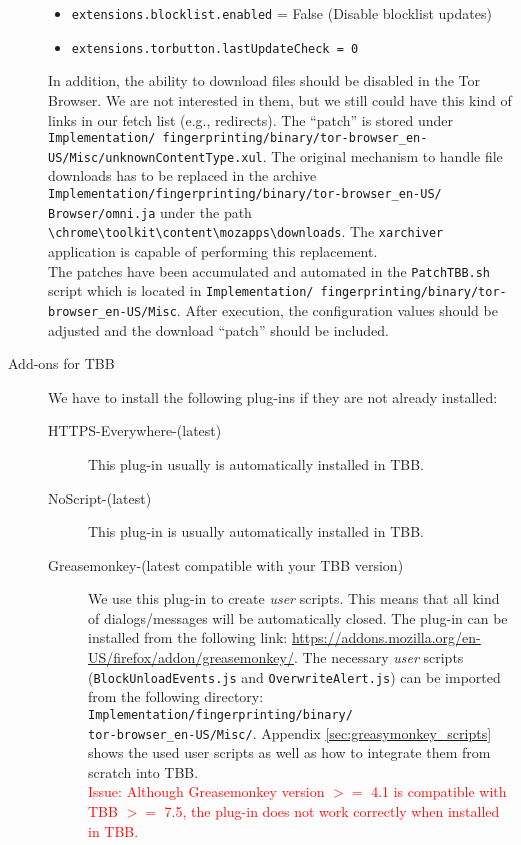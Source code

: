 \begin{description}
\begin{itemize}
\item \texttt{extensions.blocklist.enabled} = False (Disable blocklist updates)
\item \texttt{extensions.torbutton.lastUpdateCheck = 0}
\end{itemize}
In addition, the ability to download files should be disabled in the Tor Browser. We are not interested in them, but we still could have this kind of links in our fetch list (e.g., redirects). The ``patch'' is stored under \texttt{Implementation/ fingerprinting/binary/tor-browser\_en-US/Misc/unknownContentType.xul}. The original mechanism to handle file downloads has to be replaced in the archive \texttt{Implementation/fingerprinting/binary/tor-browser\_en-US/ \\Browser/omni.ja} under the path \texttt{\textbackslash chrome\textbackslash toolkit\textbackslash content\textbackslash mozapps\textbackslash downloads}. The \texttt{xarchiver} application is capable of performing this replacement.\\
The patches have been accumulated and automated in the \texttt{PatchTBB.sh} script which is located in \texttt{Implementation/ fingerprinting/binary/tor-browser\_en-US/Misc}. After execution, the configuration values should be adjusted and the download ``patch'' should be included. 
\item[Add-ons for \ac{TBB}] We have to install the following plug-ins if they are not already installed:
\begin{description}
\item[HTTPS-Everywhere-(latest)] This plug-in usually is automatically installed in \ac{TBB}.
\item[NoScript-(latest)] This plug-in is usually automatically installed in \ac{TBB}.
\item[Greasemonkey-(latest compatible with your \ac{TBB} version)] We use this plug-in to create \emph{user} scripts. This means that all kind of dialogs/messages will be automatically closed. The plug-in can be installed from the following link: \url{https://addons.mozilla.org/en-US/firefox/addon/greasemonkey/}. The necessary \emph{user} scripts (\texttt{BlockUnloadEvents.js} and \texttt{OverwriteAlert.js}) can be imported from the following directory: \texttt{Implementation/fingerprinting/binary/ \\tor-browser\_en-US/Misc/}. Appendix \ref{sec:greasymonkey_scripts} shows the used user scripts as well as how to integrate them from scratch into \ac{TBB}.\\
\textcolor{red}{Issue: Although Greasemonkey version $>=$ 4.1 is compatible with \ac{TBB} $>=$ 7.5, the plug-in does not work correctly when installed in \ac{TBB}.}
\end{description}
\end{description}

